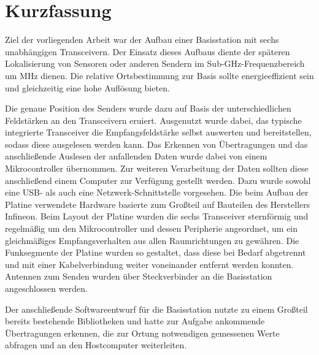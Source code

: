 
\chapter*{Kurzfassung}
\label{sec:kurzfassung}
\pagestyle{scrheadings}

Ziel der vorliegenden Arbeit war der Aufbau einer Basisstation mit sechs unabhängigen Transceivern. Der Einsatz dieses Aufbaus diente der späteren Lokalisierung von Sensoren oder anderen Sendern im Sub-GHz-Frequenzbereich um \unit[868]{MHz} dienen. Die relative Ortsbestimmung zur Basis sollte energieeffizient sein und gleichzeitig eine hohe Auflösung bieten. 

Die genaue Position des Senders wurde dazu auf Basis der unterschiedlichen Feldstärken an den Transceivern eruiert. Ausgenutzt wurde dabei, das typische integrierte Transceiver die Empfangsfeldstärke selbst auswerten und bereitstellen, sodass diese ausgelesen werden kann. Das Erkennen von Übertragungen und das anschließende Auslesen der anfallenden Daten wurde dabei von einem Mikrocontroller übernommen. Zur weiteren Verarbeitung der Daten sollten diese anschließend einem Computer zur Verfügung gestellt werden. Dazu wurde sowohl eine USB- als auch eine Netzwerk-Schnittstelle vorgesehen. Die beim Aufbau der Platine verwendete Hardware basierte zum Großteil auf Bauteilen des Herstellers Infineon. 
Beim Layout der Platine wurden die sechs Transceiver sternförmig und regelmäßig um den Mikrocontroller und dessen Peripherie angeordnet, um ein gleichmäßiges Empfangsverhalten aus allen Raumrichtungen zu gewähren. Die Funksegmente der Platine wurden so gestaltet, dass diese bei Bedarf abgetrennt und mit einer Kabelverbindung weiter voneinander entfernt werden konnten. Antennen zum Senden wurden über Steckverbinder an die Basisstation angeschlossen werden.

Der anschließende Softwareentwurf für die Basisstation nutzte zu einem Großteil bereits bestehende Bibliotheken und hatte zur Aufgabe ankommende Übertragungen erkennen, die zur Ortung notwendigen gemessenen Werte abfragen und an den Hostcomputer weiterleiten. 


